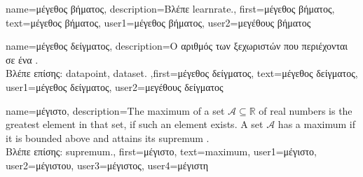 {name={\foreignlanguage{greek}{μέγεθος βήματος}}, 
	description={\foreignlanguage{greek}{Βλέπε} \gls{learnrate}.}, 
	first={\foreignlanguage{greek}{μέγεθος βήματος}},
	text={\foreignlanguage{greek}{μέγεθος βήματος}},
	user1={\foreignlanguage{greek}{μέγεθος βήματος}}, %
  	user2={\foreignlanguage{greek}{μεγέθους βήματος}} %
}

{name={\foreignlanguage{greek}{μέγεθος δείγματος}},
	description={\foreignlanguage{greek}{Ο} \foreignlanguage{greek}{αριθμός των 
		ξεχωριστών}  \foreignlanguage{greek}{που περιέχονται σε ένα} .\\
		\foreignlanguage{greek}{Βλέπε επίσης:} \gls{datapoint}, \gls{dataset}.
		},first={\foreignlanguage{greek}{μέγεθος δείγματος}},
		text={\foreignlanguage{greek}{μέγεθος δείγματος}},
		user1={\foreignlanguage{greek}{μέγεθος δείγματος}}, %
		user2={\foreignlanguage{greek}{μεγέθους δείγματος}} %
}

{name={\foreignlanguage{greek}{μέγιστο}},
     description={The maximum of a set $\mathcal{A} \subseteq \mathbb{R}$ 
     	of real numbers is the greatest element in that set, if such an element exists. A set $\mathcal{A}$ 
     	has a maximum if it is bounded above and attains its \gls{supremum} \cite[Sec.~1.4]{RudinBookPrinciplesMatheAnalysis}.\\
	\foreignlanguage{greek}{Βλέπε επίσης:} \gls{supremum}.},
 first={\foreignlanguage{greek}{μέγιστο}},
 text={maximum},
 user1={\foreignlanguage{greek}{μέγιστο}}, %
 user2={\foreignlanguage{greek}{μέγιστου}}, %
 user3={\foreignlanguage{greek}{μέγιστος}}, %
 user4={\foreignlanguage{greek}{μέγιστη}} %
}

